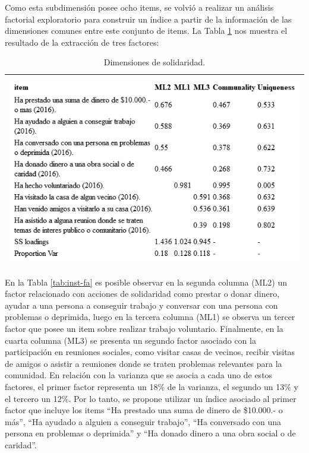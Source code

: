 \documentclass[
  12pt,
]{book}
\begin{document}
Como esta subdimensión posee ocho items, se volvió a realizar un análisis factorial exploratorio para construir un índice a partir de la información de las dimensiones comunes entre este conjunto de items. La Tabla \ref{tab:solidaridad-fa} nos muestra el resultado de la extracción de tres factores:

\begin{longtable}[]{@{}l@{}}
\caption{\label{tab:solidaridad-fa}Dimensiones de solidaridad.}\tabularnewline
\toprule
\endhead
\includegraphics[width=8.33333in,height=\textheight]{output/tables/solidaridad_fa.png}\tabularnewline
\bottomrule
\end{longtable}

En la Tabla \ref{tab:inst-fa} es posible observar en la segunda columna (ML2) un factor relacionado con acciones de solidaridad como prestar o donar dinero, ayudar a una persona a conseguir trabajo y conversar con una persona con problemas o deprimida, luego en la tercera columna (ML1) se observa un tercer factor que posee un item sobre realizar trabajo voluntario. Finalmente, en la cuarta columna (ML3) se presenta un segundo factor asociado con la participación en reuniones sociales, como visitar casas de vecinos, recibir visitas de amigos o asistir a reuniones donde se traten problemas relevantes para la comunidad. En relación con la varianza que se asocia a cada uno de estos factores, el primer factor representa un 18\% de la varianza, el segundo un 13\% y el tercero un 12\%. Por lo tanto, se propone utilizar un índice asociado al primer factor que incluye los items ``Ha prestado una suma de dinero de \$10.000.- o más'', ``Ha ayudado a alguien a conseguir trabajo'', ``Ha conversado con una persona en problemas o deprimida'' y ``Ha donado dinero a una obra social o de caridad''.
\end{document}

